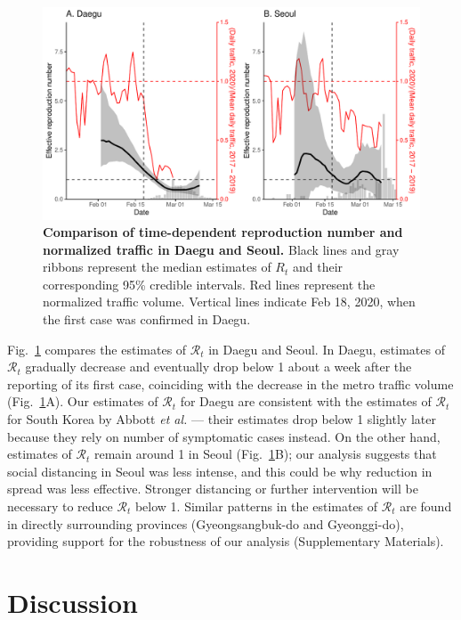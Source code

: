 \documentclass[12pt]{article}
\newcommand{\fref}[1]{Fig.~\ref{fig:#1}}
\begin{document}
\begin{figure}[!ht]
\includegraphics[width=\textwidth]{figure_compare_R_t.pdf}
\caption{
\textbf{Comparison of time-dependent reproduction number and normalized traffic in Daegu and Seoul.}
Black lines and gray ribbons represent the median estimates of $R_t$ and their corresponding 95\% credible intervals.
Red lines represent the normalized traffic volume.
Vertical lines indicate Feb 18, 2020, when the first case was confirmed in Daegu.
}
\label{fig:eff}
\end{figure}

\fref{eff} compares the estimates of $\mathcal R_t$ in Daegu and Seoul.
In Daegu, estimates of $\mathcal R_t$ gradually decrease and eventually drop below 1 about a week after the reporting of its first case, coinciding with the decrease in the metro traffic volume (\fref{eff}A).
Our estimates of $\mathcal R_t$ for Daegu are consistent with the estimates of $\mathcal R_t$ for South Korea by Abbott \textit{et al.} \cite{tempvar} --- their estimates drop below 1 slightly later because they rely on number of symptomatic cases instead.
On the other hand, estimates of $\mathcal R_t$ remain around 1 in Seoul (\fref{eff}B);
our analysis suggests that social distancing in Seoul was less intense, and this could be why reduction in spread was less effective.
Stronger distancing or further intervention will be necessary to reduce $\mathcal R_t$ below 1.
Similar patterns in the estimates of $\mathcal R_t$ are found in directly surrounding provinces (Gyeongsangbuk-do and Gyeonggi-do), providing support for the robustness of our analysis (Supplementary Materials).

\section{Discussion}
\end{document}
